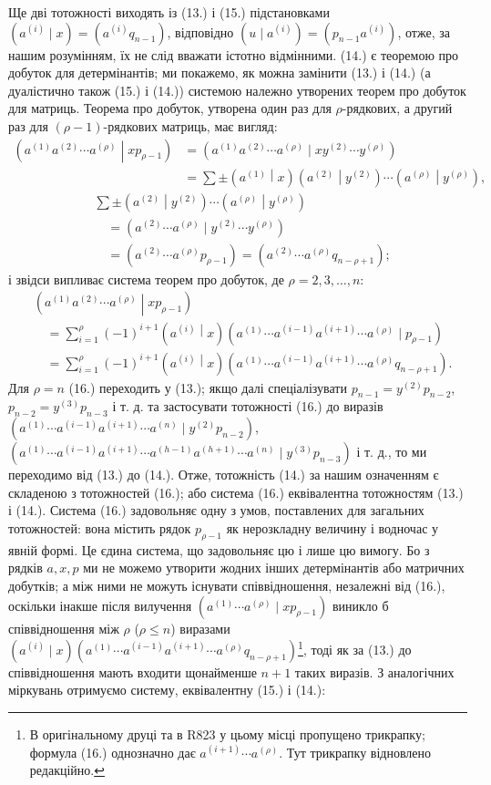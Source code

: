 \documentclass[11pt]{article}
\newcommand{\pair}[2]{\left(#1\middle|#2\right)}
\begin{document}
Ще дві тотожності виходять із (13.) і (15.) підстановками $(a^{(i)}\mid x)=(a^{(i)}q_{n-1})$, відповідно $(u\mid a^{(i)})=(p_{n-1}a^{(i)})$, отже, за нашим розумінням, їх не слід вважати істотно відмінними. (14.) є теоремою про добуток для детермінантів; ми покажемо, як можна замінити (13.) і (14.) (а дуалістично також (15.) і (14.)) системою належно утворених теорем про добуток для матриць. Теорема про добуток, утворена один раз для $\rho$-рядкових, а другий раз для $(\rho-1)$-рядкових матриць, має вигляд:
\[
\begin{aligned}
\pair{a^{(1)}a^{(2)}\cdots a^{(\rho)}}{xp_{\rho-1}}
&=(a^{(1)}a^{(2)}\cdots a^{(\rho)}\mid xy^{(2)}\cdots y^{(\rho)})\\
&=\sum\pm\pair{a^{(1)}}{x}\pair{a^{(2)}}{y^{(2)}}\cdots\pair{a^{(\rho)}}{y^{(\rho)}},
\end{aligned}
\]
\[
\begin{aligned}
&\sum\pm\pair{a^{(2)}}{y^{(2)}}\cdots\pair{a^{(\rho)}}{y^{(\rho)}}\\
&\quad=(a^{(2)}\cdots a^{(\rho)}\mid y^{(2)}\cdots y^{(\rho)})\\
&\quad=(a^{(2)}\cdots a^{(\rho)}p_{\rho-1})
=(a^{(2)}\cdots a^{(\rho)}q_{n-\rho+1});
\end{aligned}
\]
і звідси випливає система теорем про добуток, де $\rho=2,3,\ldots,n$:
\begin{equation}
\begin{aligned}
&\pair{a^{(1)}a^{(2)}\cdots a^{(\rho)}}{xp_{\rho-1}}\\
&\quad=\sum_{i=1}^{\rho}(-1)^{i+1}\pair{a^{(i)}}{x}
(a^{(1)}\cdots a^{(i-1)}a^{(i+1)}\cdots a^{(\rho)}\mid p_{\rho-1})\\
&\quad=\sum_{i=1}^{\rho}(-1)^{i+1}\pair{a^{(i)}}{x}
(a^{(1)}\cdots a^{(i-1)}a^{(i+1)}\cdots a^{(\rho)}q_{n-\rho+1}).
\end{aligned}
\tag{16}
\end{equation}
Для $\rho=n$ (16.) переходить у (13.); якщо далі спеціалізувати $p_{n-1}=y^{(2)}p_{n-2}$, $p_{n-2}=y^{(3)}p_{n-3}$ і т. д. та застосувати тотожності (16.) до виразів $(a^{(1)}\cdots a^{(i-1)}a^{(i+1)}\cdots a^{(n)}\mid y^{(2)}p_{n-2})$, $(a^{(1)}\cdots a^{(i-1)}a^{(i+1)}\cdots a^{(h-1)}a^{(h+1)}\cdots a^{(n)}\mid y^{(3)}p_{n-3})$ і т. д., то ми переходимо від (13.) до (14.). Отже, тотожність (14.) за нашим означенням є складеною з тотожностей (16.); або система (16.) еквівалентна тотожностям (13.) і (14.). Система (16.) задовольняє одну з умов, поставлених для загальних тотожностей: вона містить рядок $p_{\rho-1}$ як нерозкладну величину і водночас у явній формі. Це єдина система, що задовольняє цю і лише цю вимогу. Бо з рядків $a,x,p$ ми не можемо утворити жодних інших детермінантів або матричних добутків; а між ними не можуть існувати співвідношення, незалежні від (16.), оскільки інакше після вилучення $(a^{(1)}\cdots a^{(\rho)}\mid xp_{\rho-1})$ виникло б співвідношення між $\rho$ ($\rho\leq n$) виразами $(a^{(i)}\mid x)(a^{(1)}\cdots a^{(i-1)}a^{(i+1)}\cdots a^{(\rho)}q_{n-\rho+1})$\footnote{В оригінальному друці та в R823 у цьому місці пропущено трикрапку; формула (16.) однозначно дає $a^{(i+1)}\cdots a^{(\rho)}$. Тут трикрапку відновлено редакційно.}, тоді як за (13.) до співвідношення мають входити щонайменше $n+1$ таких виразів. З аналогічних міркувань отримуємо систему, еквівалентну (15.) і (14.):
\end{document}
